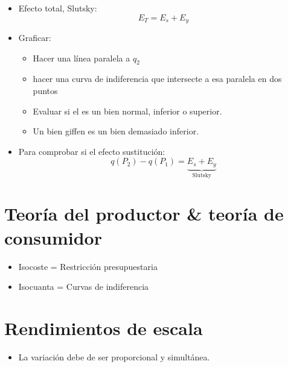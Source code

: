 \begin{itemize}
    \item Efecto total, Slutsky: 
        \[
          E_T = E_s + E_y
        \]
    
    \item Graficar:
        \begin{itemize}
            \item Hacer una línea paralela a $q_2$
            \item hacer una curva de indiferencia que intersecte a esa paralela en dos puntos
            \item Evaluar si el es un bien normal, inferior o superior.
            \item Un bien giffen es un bien demasiado inferior.
        \end{itemize}
    
    \item Para comprobar si el efecto sustitución:
        \[
          q(P_2) - q(P_1) = \underbrace{E_s + E_y }_{\text{Slutsky} }
        \]
\end{itemize}


\section{Teoría del productor \& teoría de consumidor}
\begin{itemize}
    \item Isocoste = Restricción presupuestaria
    \item Isocuanta = Curvas de indiferencia 
\end{itemize}


\section{Rendimientos de escala}
\begin{itemize}
    \item La variación debe de ser proporcional y simultánea.
\end{itemize}

